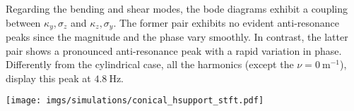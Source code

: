     Regarding the bending and shear modes, the bode diagrams exhibit a coupling between $\kappa_y, \sigma_z$ and $\kappa_z, \sigma_y$. The former pair exhibits no evident anti-resonance peaks since the magnitude and the phase vary smoothly. In contrast, the latter pair shows a pronounced anti-resonance peak with a rapid variation in phase. Differently from the cylindrical case, all the harmonics (except the $\nu = \SI{0}{\meter^{-1}}$), display this peak at $\SI{4.8}{\hertz}$.
    \begin{figure*}
        \centering
        \texttt{[image: imgs/simulations/conical\_hsupport\_stft.pdf]}
        \caption{The space-time spectra of the Conical H-Support numerical example discussed in Sec. \ref{numerical_validation:conical_hsupport}. The \acp{STFT} show the time-frequency response varying the components of the spatial spectrum. The magnitude values are normalized to $|\Xi_i(j0, j0)|$.}
        \label{fig:conical_hsupport_stft}
    \end{figure*}